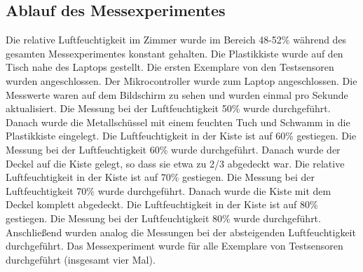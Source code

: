 \documentclass[runningheads]{llncs}
\begin{document}
\subsection{Ablauf des Messexperimentes}
Die relative Luftfeuchtigkeit im Zimmer wurde im Bereich 48-52\% während des gesamten Messexperimentes konstant gehalten. Die Plastikkiste wurde auf den Tisch nahe des Laptops gestellt. Die ersten Exemplare von den Testsensoren wurden angeschlossen. Der Mikrocontroller wurde zum Laptop angeschlossen. Die Messwerte waren auf dem Bildschirm zu sehen und wurden einmal pro Sekunde aktualisiert. Die Messung bei der Luftfeuchtigkeit 50\% wurde durchgeführt. Danach wurde die Metallschüssel mit einem feuchten Tuch und Schwamm in die Plastikkiste eingelegt. Die Luftfeuchtigkeit in der Kiste ist auf 60\% gestiegen. Die Messung bei der Luftfeuchtigkeit 60\% wurde durchgeführt. Danach wurde der Deckel auf die Kiste gelegt, so dass sie etwa zu 2/3 abgedeckt war. Die relative Luftfeuchtigkeit in der Kiste ist auf 70\% gestiegen. Die Messung bei der Luftfeuchtigkeit 70\% wurde durchgeführt. Danach wurde die Kiste mit dem Deckel komplett abgedeckt. Die Luftfeuchtigkeit in der Kiste ist auf 80\% gestiegen. Die Messung bei der Luftfeuchtigkeit 80\% wurde durchgeführt. Anschließend wurden analog die Messungen bei der absteigenden Luftfeuchtigkeit durchgeführt. Das Messexperiment wurde für alle Exemplare von Testsensoren durchgeführt (insgesamt vier Mal).
\end{document}
